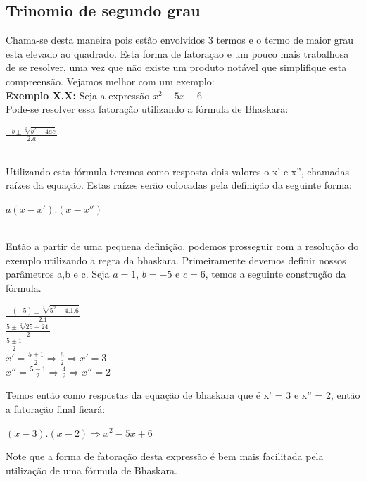 \documentclass[a4paper,12pt,twoside,BCOR=10mm]{scrbook}
\begin{document}
\begin{titlepage}
\subsection{Trinomio de segundo grau}
Chama-se desta maneira pois estão envolvidos 3 termos e o termo de maior grau esta elevado ao quadrado. Esta forma de fatoraçao e um pouco mais trabalhosa de se resolver, uma vez que não existe um produto notável que simplifique esta compreensão. Vejamos melhor com um exemplo:
\\
\textbf{Exemplo X.X:} Seja a expressão $x^{2} - 5x + 6$
\\
Pode-se resolver essa fatoração utilizando a fórmula de Bhaskara:
\\
\begin{center}
$\frac{-b \pm \sqrt[2]{b^{2} - 4ac}}{2.a}$
\end{center}
\\Utilizando esta fórmula teremos como resposta dois valores o x' e x'', chamadas raízes da equação. Estas raízes serão colocadas pela definição da seguinte forma:\\
\begin{center}
$a(x - x').(x - x'')$
\end{center}
\\
Então a partir de uma pequena definição, podemos prosseguir com a resolução do exemplo utilizando a regra da bhaskara. Primeiramente devemos definir nossos parâmetros a,b e c. Seja  $a = 1$, $b = -5$ e $c = 6$, temos a seguinte construção da fórmula.
\\
\begin{center}
$\frac{-(-5) \pm \sqrt[2]{5^{2} - 4.1.6}}{2.1}$
\\
$\frac{5 \pm \sqrt[2]{25 - 24}}{2}$
\\
$\frac{5 \pm 1}{2}$
\\
$x' = \frac{5 + 1}{2} \Rightarrow \frac{6}{2} \Rightarrow x' = 3$
\\
$x'' = \frac{5 - 1}{2} \Rightarrow \frac{4}{2} \Rightarrow x'' = 2$
\end{center}
Temos então como respostas da equação de bhaskara que é x' = 3 e x'' = 2, então a fatoração final ficará:
\\
\begin{center}
$(x - 3).(x - 2) \Rightarrow x^{2} -5x +6$
\end{center}
Note que a forma de fatoração desta expressão é bem mais facilitada pela utilização de uma fórmula de Bhaskara.

\end{titlepage}
\end{document}
